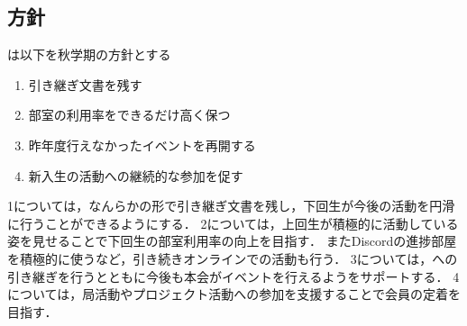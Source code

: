 \subsection*{\newGradeIfKouki{}\thirdGrade{}方針}


\thirdGrade{}は以下を秋学期の方針とする

\begin{enumerate}
    \item 引き継ぎ文書を残す
    \item 部室の利用率をできるだけ高く保つ
    \item 昨年度行えなかったイベントを再開する
    \item 新入生の活動への継続的な参加を促す
\end{enumerate}

1については，なんらかの形で引き継ぎ文書を残し，下回生が今後の活動を円滑に行うことができるようにする．
2については，上回生が積極的に活動している姿を見せることで下回生の部室利用率の向上を目指す．
またDiscordの進捗部屋を積極的に使うなど，引き続きオンラインでの活動も行う．
3については，\secondGrade{}への引き継ぎを行うとともに今後も本会がイベントを行えるよう\secondGrade{}をサポートする．
4については，局活動やプロジェクト活動への参加を支援することで会員の定着を目指す．
